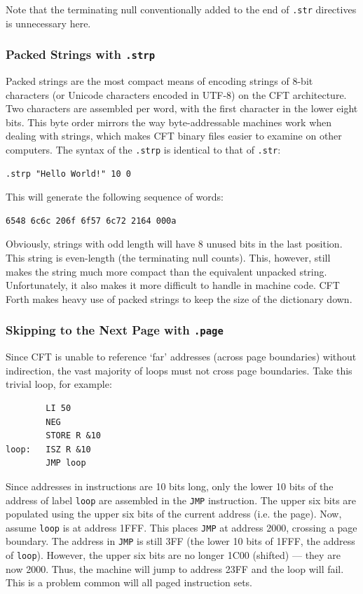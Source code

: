 \documentclass[11pt,a4paper,twocolumns]{article}
\newcommand\op[1]{\texttt{#1}}
\newcommand\f[1]{{\color{black}\texttt{#1}}}
\newcommand\hex[1]{\textsf{#1}}
\begin{document}
Note that the terminating null conventionally added to the end of \f{.str}
directives is unnecessary here.



\subsubsection{Packed Strings with \f{.strp}}

Packed strings are the most compact means of encoding strings of 8-bit
characters (or Unicode characters encoded in UTF-8) on the CFT
architecture. Two characters are assembled per word, with the first character
in the lower eight bits. This byte order mirrors the way byte-addressable
machines work when dealing with strings, which makes CFT binary files easier to
examine on other computers. The syntax of the \f{.strp} is identical to that of \f{.str}:

\begin{verbatim}
.strp "Hello World!" 10 0
\end{verbatim}

This will generate the following sequence of words:

\begin{verbatim}
6548 6c6c 206f 6f57 6c72 2164 000a
\end{verbatim}

Obviously, strings with odd length will have 8 unused bits in the last
position. This string is even-length (the terminating null counts). This,
however, still makes the string much more compact than the equivalent unpacked
string. Unfortunately, it also makes it more difficult to handle in machine
code. CFT Forth makes heavy use of packed strings to keep the size of the
dictionary down.



\subsubsection{Skipping to the Next Page with \f{.page}}

Since CFT is unable to reference ‘far’ addresses (across page boundaries)
without indirection, the vast majority of loops must not cross page
boundaries. Take this trivial loop, for example:

\begin{verbatim}
        LI 50
        NEG
        STORE R &10
loop:   ISZ R &10
        JMP loop
\end{verbatim}

Since addresses in instructions are 10 bits long, only the lower 10 bits of the
address of label \op{loop} are assembled in the \op{JMP} instruction. The upper
six bits are populated using the upper six bits of the current address
(i.e. the page). Now, assume \op{loop} is at address \hex{1FFF}. This places
\op{JMP} at address \hex{2000}, crossing a page boundary. The address in
\op{JMP} is still \hex{3FF} (the lower 10 bits of \hex{1FFF}, the address of
\op{loop}). However, the upper six bits are no longer \hex{1C00} (shifted) —
they are now \hex{2000}. Thus, the machine will jump to address \hex{23FF} and
the loop will fail. This is a problem common will all paged instruction sets.
\end{document}

